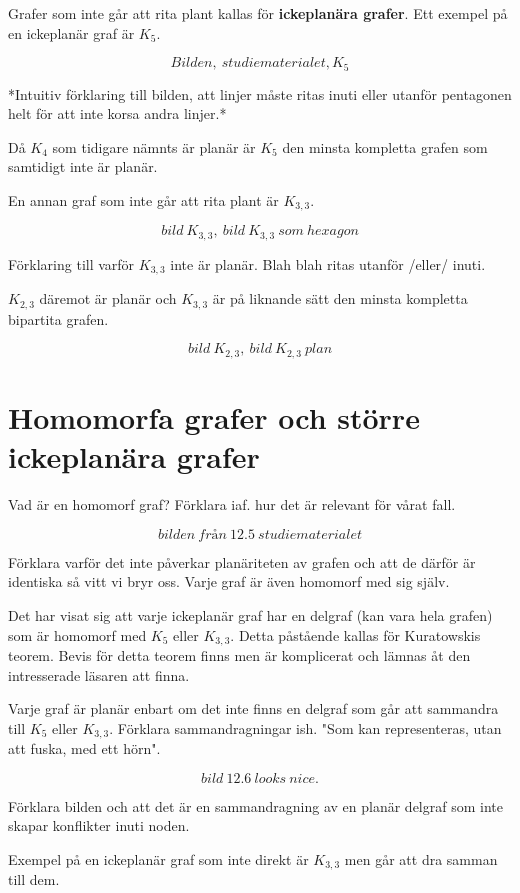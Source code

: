 \documentclass[a4paper,11pt]{article}
\begin{document}
Grafer som inte går att rita plant kallas för \textbf{ickeplanära grafer}. Ett exempel på en ickeplanär graf är $K_5$.

$$Bilden,\ studiematerialet, K_5$$

*Intuitiv förklaring till bilden, att linjer måste ritas inuti eller utanför pentagonen helt för att inte korsa andra linjer.*

Då $K_4$ som tidigare nämnts är planär är $K_5$ den minsta kompletta grafen som samtidigt inte är planär.

En annan graf som inte går att rita plant är $K_{3,3}$.

$$bild\ K_{3,3},\ bild\ K_{3,3}\ som\ hexagon$$

Förklaring till varför $K_{3,3}$ inte är planär. Blah blah ritas utanför /eller/ inuti.

$K_{2,3}$ däremot är planär och $K_{3,3}$ är på liknande sätt den minsta kompletta bipartita grafen. 

$$bild\ K_{2,3},\ bild\ K_{2,3}\ plan$$

\section*{Homomorfa grafer och större ickeplanära grafer}

Vad är en homomorf graf? Förklara iaf. hur det är relevant för vårat fall.

$$bilden\ från\ 12.5\ studiematerialet$$

Förklara varför det inte påverkar planäriteten av grafen och att de därför är identiska så vitt vi bryr oss. Varje graf är även homomorf med sig själv.

Det har visat sig att varje ickeplanär graf har en delgraf (kan vara hela grafen) som är homomorf med $K_{5}$ eller $K_{3,3}$. Detta påstående kallas för Kuratowskis teorem. Bevis för detta teorem finns men är komplicerat och lämnas åt den intresserade läsaren att finna.

Varje graf är planär enbart om det inte finns en delgraf som går att sammandra till $K_5$ eller $K_{3,3}$. Förklara sammandragningar ish. "Som kan representeras, utan att fuska\texttrademark, med ett hörn".

$$bild\ 12.6\ looks\ nice.$$

Förklara bilden och att det är en sammandragning av en planär delgraf som inte skapar konflikter inuti noden.

Exempel på en ickeplanär graf som inte direkt är $K_{3,3}$ men går att dra samman till dem.
\end{document}
